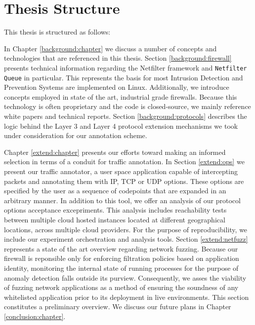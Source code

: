 \section{Thesis Structure}
\label{intro:structure}

This thesis is structured as follows:

In Chapter \ref{background:chapter} we discuss a number of concepts and
technologies that are referenced in this thesis. Section \ref{background:firewall}
presents technical information regarding the Netfilter framework and
\texttt{Netfilter Queue} in particular. This represents the basis for most
Intrusion Detection and Prevention Systems are implemented on Linux. Additionally,
we introduce concepts employed in state of the art, industrial grade firewalls.
Because this technology is often proprietary and the code is closed-source, we
mainly reference white papers and technical reports. Section \ref{background:protocols}
describes the logic behind the Layer 3 and Layer 4 protocol extension mechanisms
we took under consideration for our annotation scheme.


Chapter \ref{extend:chapter} presents our efforts toward making an informed
selection in terms of a conduit for traffic annotation. In Section \ref{extend:ops}
we present our traffic annotator, a user space application capable of intercepting
packets and annotating them with IP, TCP or UDP options. These options are
specified by the user as a sequence of codepoints that are expanded in an
arbitrary manner. In addition to this tool, we offer an analysis of our protocol
options acceptance excepriments. This analysis includes reachability tests between
multiple cloud hosted instances located at different geographical locations,
across multiple cloud providers. For the purpose of reproducibility, we include
our experiment orchestration and analysis tools. Section \ref{extend:netfuzz}
represents a state of the art overview regarding network fuzzing. Because our
firewall is reponsible only for enforcing filtration policies based on application
identity, monitoring the internal state of running processes for the purpose of
anomaly detection falls outside its purview. Consequently, we asses the viability
of fuzzing network applications as a method of ensuring the soundness of any
whitelisted application prior to its deployment in live environments. This
section constitutes a preliminary overview. We discuss our future plans in
Chapter \ref{conclusion:chapter}.

